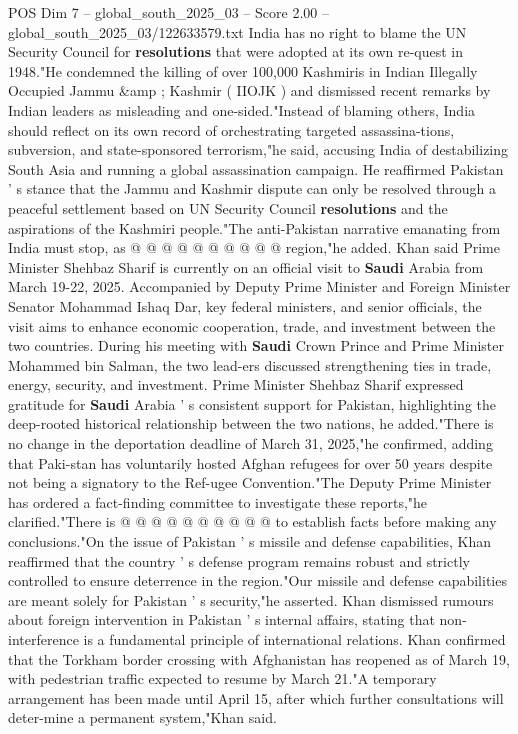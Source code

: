 \begin{textsample}{POS Dim 7 – global\_south\_2025\_03 – Score 2.00 – global\_south\_2025\_03/122633579.txt}
India has no right to blame the UN Security Council for \textbf{resolutions} that were adopted at its own re-quest in 1948."He condemned the killing of over 100,000 Kashmiris in Indian Illegally Occupied Jammu \&amp ; Kashmir ( IIOJK ) and dismissed recent remarks by Indian leaders as misleading and one-sided."Instead of blaming others, India should reflect on its own record of orchestrating targeted assassina-tions, subversion, and state-sponsored terrorism,"he said, accusing India of destabilizing South Asia and running a global assassination campaign.
He reaffirmed Pakistan ' s stance that the Jammu and Kashmir dispute can only be resolved through a peaceful settlement based on UN Security Council \textbf{resolutions} and the aspirations of the Kashmiri people."The anti-Pakistan narrative emanating from India must stop, as @ @ @ @ @ @ @ @ @ @ region,"he added.
Khan said Prime Minister Shehbaz Sharif is currently on an official visit to \textbf{Saudi} Arabia from March 19-22, 2025.
Accompanied by Deputy Prime Minister and Foreign Minister Senator Mohammad Ishaq Dar, key federal ministers, and senior officials, the visit aims to enhance economic cooperation, trade, and investment between the two countries.
During his meeting with \textbf{Saudi} Crown Prince and Prime Minister Mohammed bin Salman, the two lead-ers discussed strengthening ties in trade, energy, security, and investment.
Prime Minister Shehbaz Sharif expressed gratitude for \textbf{Saudi} Arabia ' s consistent support for Pakistan, highlighting the deep-rooted historical relationship between the two nations, he added."There is no change in the deportation deadline of March 31, 2025,"he confirmed, adding that Paki-stan has voluntarily hosted Afghan refugees for over 50 years despite not being a signatory to the Ref-ugee Convention."The Deputy Prime Minister has ordered a fact-finding committee to investigate these reports,"he clarified."There is @ @ @ @ @ @ @ @ @ @ to establish facts before making any conclusions."On the issue of Pakistan ' s missile and defense capabilities, Khan reaffirmed that the country ' s defense program remains robust and strictly controlled to ensure deterrence in the region."Our missile and defense capabilities are meant solely for Pakistan ' s security,"he asserted.
Khan dismissed rumours about foreign intervention in Pakistan ' s internal affairs, stating that non-interference is a fundamental principle of international relations.
Khan confirmed that the Torkham border crossing with Afghanistan has reopened as of March 19, with pedestrian traffic expected to resume by March 21."A temporary arrangement has been made until April 15, after which further consultations will deter-mine a permanent system,"Khan said.

\end{textsample}
